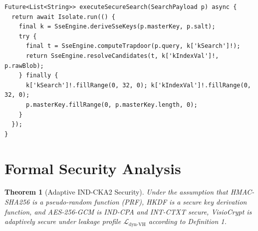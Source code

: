 \documentclass[10pt,conference]{IEEEtran}
\newenvironment{revised}{\color{revcolor}}{}
\newtheorem{theorem}{Theorem}
\begin{document}
\begin{revised}
\begin{lstlisting}[style=dartstyle,caption={Isolated Worker Routine with Memory Zeroization},label={lst:isolate}]
Future<List<String>> executeSecureSearch(SearchPayload p) async {
  return await Isolate.run(() {
    final k = SseEngine.deriveSseKeys(p.masterKey, p.salt);
    try {
      final t = SseEngine.computeTrapdoor(p.query, k['kSearch']!);
      return SseEngine.resolveCandidates(t, k['kIndexVal']!, p.rawBlob);
    } finally {
      k['kSearch']!.fillRange(0, 32, 0); k['kIndexVal']!.fillRange(0, 32, 0);
      p.masterKey.fillRange(0, p.masterKey.length, 0);
    }
  });
}
\end{lstlisting}

\section{Formal Security Analysis}
\begin{theorem}[Adaptive IND-CKA2 Security]
Under the assumption that HMAC-SHA256 is a pseudo-random function (PRF), HKDF is a secure key derivation function, and AES-256-GCM is IND-CPA and INT-CTXT secure, VisioCrypt is adaptively secure under leakage profile $\mathcal{L}_{\text{dyn-VH}}$ according to Definition 1.
\end{theorem}


\end{revised}
\end{document}
